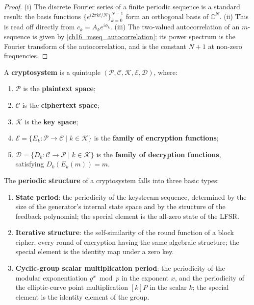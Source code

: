 \begin{proof}
(i) The discrete Fourier series of a finite periodic sequence is a standard result: the basis functions \(\{e^{i2\pi kt/N}\}_{k=0}^{N-1}\) form an orthogonal basis of \(\mathbb C^N\).
(ii) This is read off directly from \(c_k=A_k e^{i\phi_k}\).
(iii) The two-valued autocorrelation of an \(m\)-sequence is given by \cref{ch16_mseq_autocorrelation}; its power spectrum is the Fourier transform of the autocorrelation, and is the constant \(N+1\) at non-zero frequencies.
\end{proof}

\begin{definition}[Cryptosystem]\label{def:cryptosystem}
A \textbf{cryptosystem} is a quintuple \((\mathcal P,\mathcal C,\mathcal K,\mathcal E,\mathcal D)\), where:
\begin{enumerate}[label=(\roman*)]
    \item \(\mathcal P\) is the \textbf{plaintext space};
    \item \(\mathcal C\) is the \textbf{ciphertext space};
    \item \(\mathcal K\) is the \textbf{key space};
    \item \(\mathcal E=\{E_k:\mathcal P\to\mathcal C\mid k\in\mathcal K\}\) is the \textbf{family of encryption functions};
    \item \(\mathcal D=\{D_k:\mathcal C\to\mathcal P\mid k\in\mathcal K\}\) is the \textbf{family of decryption functions}, satisfying \(D_k(E_k(m))=m\).
\end{enumerate}
\end{definition}

\begin{definition}\label{def:crypto_periodic_structure}
The \textbf{periodic structure} of a cryptosystem falls into three basic types:
\begin{enumerate}[label=(\roman*)]
    \item \textbf{State period}: the periodicity of the keystream sequence, determined by the size of the generator's internal state space and by the structure of the feedback polynomial; the special element is the all-zero state of the LFSR.
    \item \textbf{Iterative structure}: the self-similarity of the round function of a block cipher, every round of encryption having the same algebraic structure; the special element is the identity map under a zero key.
    \item \textbf{Cyclic-group scalar multiplication period}: the periodicity of the modular exponentiation \(g^x\bmod p\) in the exponent \(x\), and the periodicity of the elliptic-curve point multiplication \([k]P\) in the scalar \(k\); the special element is the identity element of the group.
\end{enumerate}
\end{definition}

